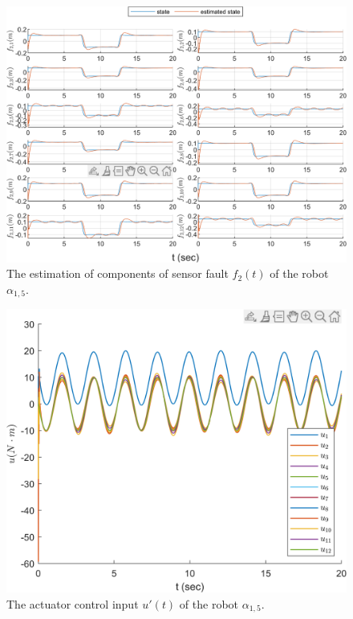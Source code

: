 \documentclass[journal,12pt,onecolumn,draftclsnofoot,]{IEEEtran}
\begin{document}
\begin{figure}[htbp]
    \centering
    \includegraphics[scale=.57]{fig/robot (3).png}\caption{The estimation of components of sensor fault $f_2(t)$ of the robot $\alpha_{1,5}$.}%
    \label{fig:robot, fs}
\end{figure}
\begin{figure}[htbp]
    \centering
    \includegraphics[scale=.57]{fig/robot (4).png}\caption{The actuator control input $u'(t)$ of the robot $\alpha_{1,5}$.}%
    \label{fig:robot, control}
\end{figure}
\end{document}
